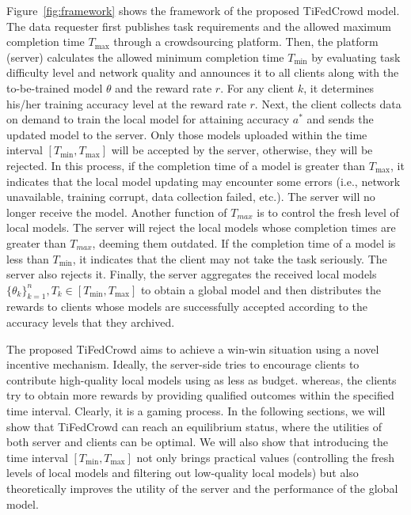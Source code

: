 \documentclass[final,1p,times]{elsarticle}
\begin{document}
Figure~\ref{fig:framework} shows the framework of the proposed TiFedCrowd model. The data requester first publishes task requirements and the allowed maximum completion time $T_{\max}$ through a crowdsourcing platform. Then, the platform (server) calculates the allowed minimum completion time $T_{\min}$ by evaluating task difficulty level and network quality and announces it to all clients along with the to-be-trained model $\theta$ and the reward rate $r$. For any client $k$, it determines his/her training accuracy level at the reward rate $r$. Next, the client collects data on demand to train the local model for attaining accuracy $a^\ast$ and sends the updated model to the server. Only those models uploaded within the time interval $[T_{\min},T_{\max}]$ will be accepted by the server, otherwise, they will be rejected. In this process, if the completion time of a model is greater than $T_{\max}$, it indicates that the local model updating may encounter some errors (i.e., network unavailable, training corrupt, data collection failed, etc.). The server will no longer receive the model. Another function of $T_{max}$ is to control the fresh level of local models. The server will reject the local models whose completion times are greater than $T_{max}$, deeming them outdated. If the completion time of a model is less than $T_{\min}$, it indicates that the client may not take the task seriously. The server also rejects it.  Finally, the server aggregates the received local models $\{\theta_k\}_{k=1}^n,T_k\in[T_{\min},T_{\max}]$ to obtain a global model and then distributes the rewards to clients whose models are successfully accepted according to the accuracy levels that they archived. 

The proposed TiFedCrowd aims to achieve a win-win situation using a novel incentive mechanism. Ideally, the server-side tries to encourage clients to contribute high-quality local models using as less as budget. whereas, the clients try to obtain more rewards by providing qualified outcomes within the specified time interval. Clearly, it is a gaming process. In the following sections, we will show that TiFedCrowd can reach an equilibrium status, where the utilities of both server and clients can be optimal. We will also show that introducing the time interval $[T_{\min}, T_{\max}]$ not only brings practical values (controlling the fresh levels of local models and filtering out low-quality local models) but also theoretically improves the utility of the server and the performance of the global model.
\end{document}
